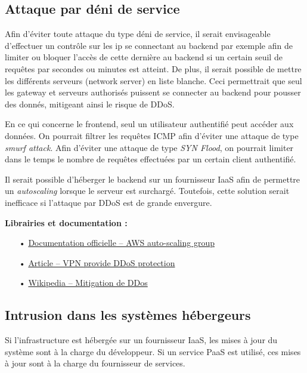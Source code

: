 \documentclass[12pt]{article}
\begin{document}
\subsection{Attaque par déni de service}
\label{ssec:cm-ddos}

Afin d'éviter toute attaque du type déni de service, il serait envisageable d'effectuer un contrôle sur les ip se connectant au backend par exemple afin de limiter ou bloquer l'accès de cette dernière au backend si un certain seuil de requêtes par secondes ou minutes est atteint. De plus, il serait possible de mettre les différents serveurs (network server) en liste blanche. Ceci permettrait que seul les gateway et serveurs authorisés puissent se connecter au backend pour pousser des donnés, mitigeant ainsi le risque de DDoS.

En ce qui concerne le frontend, seul un utilisateur authentifié peut accéder aux données. On pourrait filtrer les requêtes ICMP afin d'éviter une attaque de type \textit{smurf attack}. Afin d'éviter une attaque de type \textit{SYN Flood}, on pourrait limiter dans le temps le nombre de requêtes effectuées par un certain client authentifié.

Il serait possible d'héberger le backend sur un fournisseur IaaS afin de permettre un \textit{autoscaling} lorsque le serveur est surchargé. Toutefois, cette solution serait inefficace si l'attaque par DDoS est de grande envergure.

\medskip
\textbf{Librairies et documentation :}

\begin{itemize}
\item[•] \href{https://docs.aws.amazon.com/autoscaling/ec2/userguide/AutoScalingGroup.html}{Documentation officielle -- AWS auto-scaling group}
\item[•] \href{https://vpn-services.bestreviews.net/vpn-provide-ddos-protection/}{Article -- VPN provide DDoS protection}
\item[•] \href{https://fr.wikipedia.org/wiki/Mitigation_de_DDoS}{Wikipedia -- Mitigation de DDos}
\end{itemize}

\subsection{Intrusion dans les systèmes hébergeurs}
\label{ssec:cm-intrusion}

Si l'infrastructure est hébergée sur un fournisseur IaaS, les mises à jour du système sont à la charge du développeur. Si un service PaaS est utilisé, ces mises à jour sont à la charge du fournisseur de services.
\end{document}

